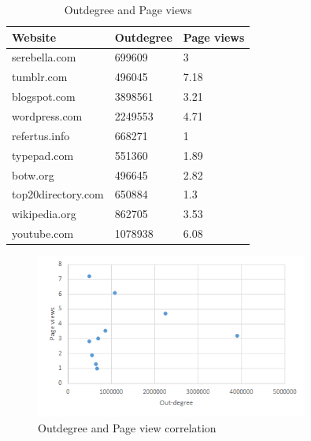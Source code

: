 \begin{table}[H]
	\caption{Outdegree and Page views}
	\label{t4}
	\begin{center}
		\begin{tabular}{|l|l|l|}
			\hline
			Website	&Outdegree	&Page views \\ \hline
			serebella.com	&699609	&3 \\ \hline
			tumblr.com	&496045	&7.18 \\ \hline
			blogspot.com	&3898561	&3.21 \\ \hline
			wordpress.com	&2249553	&4.71 \\ \hline
			refertus.info	&668271	&1 \\ \hline
			typepad.com	&551360	&1.89 \\ \hline
			botw.org	&496645	&2.82 \\ \hline
			top20directory.com	&650884	&1.3 \\ \hline
			wikipedia.org	&862705	&3.53 \\ \hline	
			youtube.com	&1078938	&6.08 \\ \hline			
		\end{tabular}
	\end{center}
\end{table}

\begin{figure}[H]	
	\begin{center}
		\caption{Outdegree and Page view correlation}		
		\label{fig16}		
		\includegraphics[width=0.8\textwidth]{fig16}	
	\end{center}
\end{figure}
